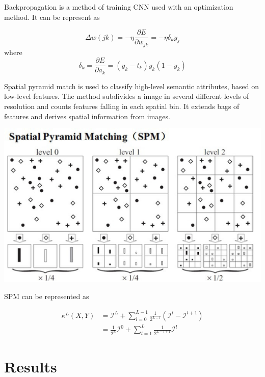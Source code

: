 \documentclass[a0,portrait]{a0poster}
\begin{document}
\begin{multicols}{2}
Backpropagation is a method of training CNN used with an optimization method. It can be represent as

\begin{equation}\label{eq:h2oBP}
\Delta w(jk) = -\eta \frac{\partial E}{\partial w_{jk}} = -\eta \delta_{k}y_{j}
\end{equation}
where $$\delta_{k} = \frac{\partial E}{\partial a_{k}} = (y_{k} - t_{k})y_{k}(1 - y_{k})$$

Spatial pyramid match\cite{lazebnik2006beyond} is used to classify high-level semantic attributes, based on low-level features. The method subdivides a image in several different levels of resolution and counts features falling in each spatial bin. It extends bags of features and derives spatial information from images.

\begin{center}\vspace{1cm}
\includegraphics[width=0.8\linewidth]{figures/spm.jpg}
\end{center}\vspace{1cm}
 
SPM can be represented as

\begin{align*}
\kappa^{L}(X,Y) &= \mathcal{I}^{L} + \sum_{l=0}^{L-1}\frac{1}{{2}^{L-l}}(\mathcal{I}^{l}-\mathcal{I}^{l+1})\\
 & = \frac{1}{2^{L}}\mathcal{I}^{0} + \sum_{l=1}^{L}\frac{1}{2^{L-l+1}}\mathcal{I}^{l}
\end{align*}


\section*{Results}


\end{multicols}
\end{document}
